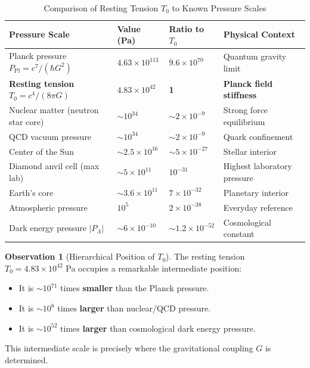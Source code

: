 \documentclass[11pt,a4paper]{article}
\newcommand{\ee}[1]{\times 10^{#1}}
\newcommand{\Tzero}{\ensuremath{T_0}}
\theoremstyle{definition}
\newtheorem{observation}{Observation}
\begin{document}
\begin{table}[H]
\centering
\caption{Comparison of Resting Tension $\Tzero$ to Known Pressure Scales}
\label{tab:pressure_comparison}
\begin{tabular}{@{}llll@{}}
\toprule
\textbf{Pressure Scale} & \textbf{Value (Pa)} & \textbf{Ratio to $\Tzero$} & \textbf{Physical Context} \\
\midrule
Planck pressure $P_{\mathrm{Pl}} = c^7/(\hbar G^2)$ & $4.63 \ee{113}$ & $9.6 \ee{70}$ & Quantum gravity limit \\
\textbf{Resting tension} $\Tzero = c^4/(8\pi G)$ & $4.83 \ee{42}$ & \textbf{1} & \textbf{Planck field stiffness} \\
Nuclear matter (neutron star core) & $\sim 10^{34}$ & $\sim 2 \ee{-9}$ & Strong force equilibrium \\
QCD vacuum pressure & $\sim 10^{34}$ & $\sim 2 \ee{-9}$ & Quark confinement \\
Center of the Sun & $\sim 2.5 \ee{16}$ & $\sim 5 \ee{-27}$ & Stellar interior \\
Diamond anvil cell (max lab) & $\sim 5 \ee{11}$ & $10^{-31}$ & Highest laboratory pressure \\
Earth's core & $\sim 3.6 \ee{11}$ & $7 \ee{-32}$ & Planetary interior \\
Atmospheric pressure & $10^5$ & $2 \ee{-38}$ & Everyday reference \\
Dark energy pressure $|P_\Lambda|$ & $\sim 6 \ee{-10}$ & $\sim 1.2 \ee{-52}$ & Cosmological constant \\
\bottomrule
\end{tabular}
\end{table}

\begin{observation}[Hierarchical Position of $\Tzero$]
The resting tension $\Tzero = 4.83 \times 10^{42}$ Pa occupies a remarkable intermediate position:
\begin{itemize}
    \item It is $\sim 10^{71}$ times \textbf{smaller} than the Planck pressure.
    \item It is $\sim 10^{8}$ times \textbf{larger} than nuclear/QCD pressure.
    \item It is $\sim 10^{52}$ times \textbf{larger} than cosmological dark energy pressure.
\end{itemize}
This intermediate scale is precisely where the gravitational coupling $G$ is determined.
\end{observation}
\end{document}
